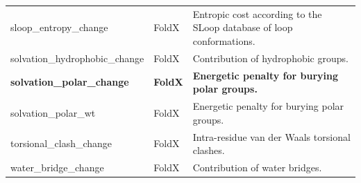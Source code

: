 \begin{table}[tb]
\begin{tabular}{ l | l | p{8cm} }
		sloop\_entropy\_change                & FoldX            & Entropic cost according to the SLoop database of loop conformations.                                       \\
		solvation\_hydrophobic\_change        & FoldX            & Contribution of hydrophobic groups.                                                                        \\
		\textbf{solvation\_polar\_change}     & \textbf{FoldX}   & \textbf{Energetic penalty for burying polar groups.}                                                       \\
		solvation\_polar\_wt                  & FoldX            & Energetic penalty for burying polar groups.                                                                \\
		torsional\_clash\_change              & FoldX            & Intra-residue van der Waals torsional clashes.                                                             \\
		water\_bridge\_change                 & FoldX            & Contribution of water bridges.                                                                             \\
		\bottomrule
	\end{tabular}
\end{table}

